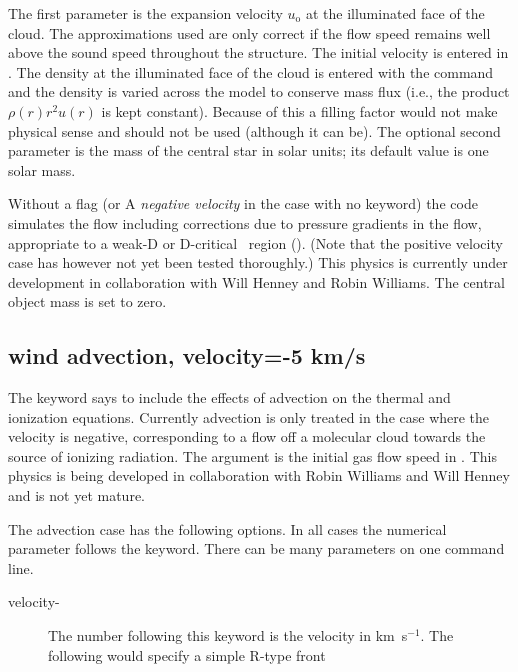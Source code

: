 The first parameter is the expansion velocity $u_{\mathrm{o}}$ at the
illuminated face of the cloud.  The approximations used are only
correct if the flow speed remains well above the sound speed
throughout the structure.  The initial velocity is entered in \kmps.
The density at the illuminated face of the cloud is entered with the
 command and the density is varied across the model to
conserve mass flux (i.e., the product $\rho ( r )r^2 u( r )$ is kept
constant).  Because of this a filling factor would not make physical
sense and should not be used (although it can be).  The optional
second parameter is the mass of the central star in solar units; its
default value is one solar mass.

\begin{shaded}
\experimental Without a  flag (or A
\emph{negative velocity} in the case with no 
keyword) the code simulates the flow including corrections due
to pressure gradients in the flow, appropriate to a weak-D or
D-critical \hii\ region (\citealp{Henney2005}).  (Note that the
positive velocity case has however not yet been tested thoroughly.)
This physics is currently under development in collaboration with Will
Henney and Robin Williams.  The central object mass is set to zero.

\subsection{\experimental wind advection, velocity=-5 km/s}

The  keyword says to include the effects of
advection on the
thermal and ionization equations.
Currently advection is only treated in
the case where the velocity is negative, corresponding to a flow off a
molecular cloud towards the source of ionizing radiation.
The argument
is the initial gas flow speed in \kmps.
This physics is being developed
in collaboration with Robin Williams and Will Henney and
is not yet mature.

The advection case has the following options.
In all cases the numerical
parameter follows the keyword.
There can be many parameters on one command line.

\begin{description}
\item[velocity-] The number following this keyword is the velocity in
km~s$^{-1}$.
The following would specify a simple R-type front


\end{description}
\end{shaded}
